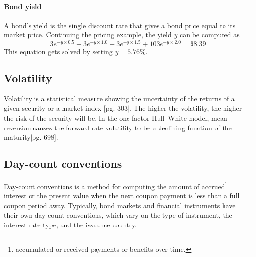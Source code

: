 \paragraph{Bond yield}
A bond's yield is the single discount rate that gives a bond price equal to its market price. Continuing the pricing example, the yield $y$ can be computed as
\begin{equation*}
    3e^{-y \times 0.5} + 3e^{-y \times 1.0} + 3e^{-y \times 1.5} + 103e^{-y \times 2.0} = 98.39
\end{equation*}
This equation gets solved by setting $y = 6.76\%$.~\cite[pg.81]{ofod}

\subsection{Volatility}
Volatility is a statistical measure showing the uncertainty of the returns of a given security or a market index \cite{ofod}[pg. 303]. The higher the volatility, the higher the risk of the security will be. In the one-factor Hull–White model, mean reversion causes the forward rate volatility to be a declining function of the maturity\cite{ofod}[pg. 698]. 

\subsection{Day-count conventions}
Day-count conventions is a method for computing the amount of accrued\footnote{accumulated or received payments or benefits over time.} interest or the present value when the next coupon payment is less than a full coupon period away. Typically, bond markets and financial instruments have their own day-count conventions, which vary on the type of instrument, the interest rate type, and the issuance country. 


